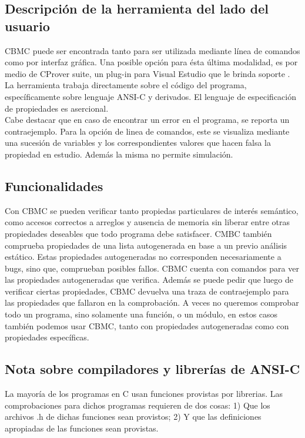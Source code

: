 \documentclass{llncs}
\begin{document}
    \subsection{Descripción de la herramienta del lado del usuario}
        CBMC puede ser encontrada tanto para ser utilizada mediante línea de
        comandos como por interfaz gráfica. Una posible opción para ésta última
        modalidad, es por medio de CProver suite, un plug-in para Visual Estudio
        que le brinda soporte \cite{webcprover}.\\
        \indent La herramienta trabaja directamente sobre el código del
        programa, específicamente sobre lenguaje ANSI-C y derivados. El lenguaje
        de especificación de propiedades es asercional.\\ \indent Cabe destacar
        que en caso de encontrar un error en el programa, se reporta un
        contraejemplo.
        Para la opción de linea de comandos, este se visualiza mediante
        una sucesión de variables y los correspondientes valores que hacen falsa
        la propiedad en estudio. Además la misma no permite simulación.

    \subsection{Funcionalidades}
        Con CBMC se pueden verificar tanto propiedas particulares de interés
        semántico, como accesos correctos a arreglos y ausencia de memoria sin
        liberar entre otras propiedades deseables que todo programa debe
        satisfacer. CMBC también comprueba propiedades de una lista
        autogenerada en base a un previo análisis estático. Estas propiedades
        autogeneradas no corresponden necesariamente a bugs, sino que,
        comprueban posibles fallos. CBMC cuenta con comandos para ver las
        propiedades autogeneradas que verifica. Además se puede pedir que luego
        de verificar ciertas propiedades, CBMC devuelva una traza de
        contraejemplo para las propiedades que fallaron en la comprobación.
        A veces no queremos comprobar todo un programa, sino solamente una
        función, o un módulo, en estos casos también podemos usar CBMC, tanto
        con propiedades autogeneradas como con propiedades específicas.

    \subsection{Nota sobre compiladores y librerías de ANSI-C}
        La mayoría de los programas en C usan funciones provistas por
        librerias.
        Las comprobaciones para dichos programas requieren de dos cosas:
        1) Que los archivos .h de dichas funciones sean provistos;
        2) Y que las definiciones apropiadas de las funciones sean provistas.
\end{document}
